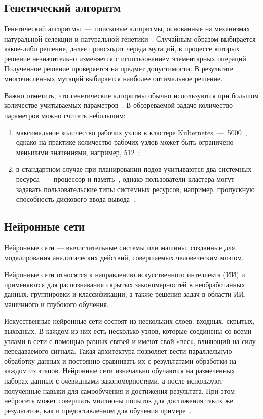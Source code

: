 \subsection{Генетический алгоритм}

Генетический алгоритмы~---~поисковые алгоритмы, основанные на механизмах натуральной селекции и натуральной генетики~\cite{курейчик1998генетические}. Случайным образом выбирается какое-либо решение, далее происходит череда мутаций, в процессе которых решение незначительно изменяется с использованием элементарных операций. Полученное решение проверяется на предмет допустимости. В результате многочисленных мутаций выбирается наиболее оптимальное решение.

Важно отметить, что генетические алгоритмы обычно используются при большом количестве учитываемых параметров~\cite{гладков2022генетические}. В обозреваемой задаче количество параметров можно считать небольшим:

\begin{enumerate}
	\item максимальное количество рабочих узлов в кластере Kubernetes~---~5000~\cite{large}, однако на практике количество рабочих узлов может быть ограничено меньшими значениями, например, 512~\cite{digitalocean};
	\item в стандартном случае при планировании подов учитываются два системных ресурса~---~процессор и память~\cite{resource_management}, однако пользователи кластера могут задавать пользовательские типы системных ресурсов, например, пропускную способность дискового ввода-вывода~\cite{phdays}.
\end{enumerate}

\subsection{Нейронные сети}

Нейронные сети — вычислительные системы или машины, созданные для моделирования аналитических действий, совершаемых человеческим мозгом.

Нейронные сети относятся к направлению искусственного интеллекта (ИИ) и применяются для распознавания скрытых закономерностей в необработанных данных, группировки и классификации, а также решения задач в области ИИ, машинного и глубокого обучения.

Искусственные нейронные сети состоят из нескольких слоев: входных, скрытых, выходных. В каждом из них есть несколько узлов, которые соединены со всеми узлами в сети с помощью разных связей и имеют свой «вес», влияющий на силу передаваемого сигнала. Такая архитектура позволяет вести параллельную обработку данных и постоянно сравнивать их с результатами обработки на каждом из этапов. Нейронные сети изначально обучаются на размеченных наборах данных с очевидными закономерностями, а после используют полученные навыки для самообучения и достижения результата. При этом нейросеть может совершать миллионы попыток для достижения таких же результатов, как и предоставленном для обучения примере~\cite{neural}.

